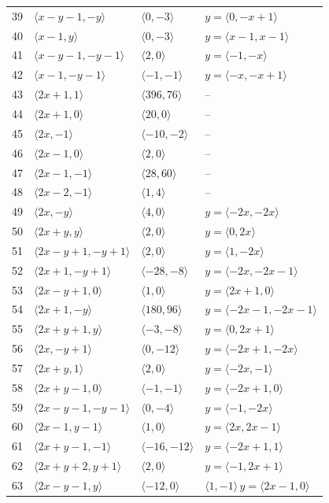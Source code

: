 \documentclass[11pt]{article}
\begin{document}
\begin{longtable}{@{}rlll@{}}
39 & $\langle x-y-1,-y\rangle$ & $\langle 0,-3\rangle$ & $y=\langle 0,-x+1\rangle$\\
40 & $\langle x-1,y\rangle$ & $\langle 0,-3\rangle$ & $y=\langle x-1,x-1\rangle$\\
41 & $\langle x-y-1,-y-1\rangle$ & $\langle 2,0\rangle$ & $y=\langle -1,-x\rangle$\\
42 & $\langle x-1,-y-1\rangle$ & $\langle -1,-1\rangle$ & $y=\langle -x,-x+1\rangle$\\
43 & $\langle 2x+1,1\rangle$ & $\langle 396,76\rangle$ & --\\
44 & $\langle 2x+1,0\rangle$ & $\langle 20,0\rangle$ & --\\
45 & $\langle 2x,-1\rangle$ & $\langle -10,-2\rangle$ & --\\
46 & $\langle 2x-1,0\rangle$ & $\langle 2,0\rangle$ & --\\
47 & $\langle 2x-1,-1\rangle$ & $\langle 28,60\rangle$ & --\\
48 & $\langle 2x-2,-1\rangle$ & $\langle 1,4\rangle$ & --\\
49 & $\langle 2x,-y\rangle$ & $\langle 4,0\rangle$ & $y=\langle -2x,-2x\rangle$\\
50 & $\langle 2x+y,y\rangle$ & $\langle 2,0\rangle$ & $y=\langle 0,2x\rangle$\\
51 & $\langle 2x-y+1,-y+1\rangle$ & $\langle 2,0\rangle$ & $y=\langle 1,-2x\rangle$\\
52 & $\langle 2x+1,-y+1\rangle$ & $\langle -28,-8\rangle$ & $y=\langle -2x,-2x-1\rangle$\\
53 & $\langle 2x-y+1,0\rangle$ & $\langle 1,0\rangle$ & $y=\langle 2x+1,0\rangle$\\
54 & $\langle 2x+1,-y\rangle$ & $\langle 180,96\rangle$ & $y=\langle -2x-1,-2x-1\rangle$\\
55 & $\langle 2x+y+1,y\rangle$ & $\langle -3,-8\rangle$ & $y=\langle 0,2x+1\rangle$\\
56 & $\langle 2x,-y+1\rangle$ & $\langle 0,-12\rangle$ & $y=\langle -2x+1,-2x\rangle$\\
57 & $\langle 2x+y,1\rangle$ & $\langle 2,0\rangle$ & $y=\langle -2x,-1\rangle$\\
58 & $\langle 2x+y-1,0\rangle$ & $\langle -1,-1\rangle$ & $y=\langle -2x+1,0\rangle$\\
59 & $\langle 2x-y-1,-y-1\rangle$ & $\langle 0,-4\rangle$ & $y=\langle -1,-2x\rangle$\\
60 & $\langle 2x-1,y-1\rangle$ & $\langle 1,0\rangle$ & $y=\langle 2x,2x-1\rangle$\\
61 & $\langle 2x+y-1,-1\rangle$ & $\langle -16,-12\rangle$ & $y=\langle -2x+1,1\rangle$\\
62 & $\langle 2x+y+2,y+1\rangle$ & $\langle 2,0\rangle$ & $y=\langle -1,2x+1\rangle$\\
63 & $\langle 2x-y-1,y\rangle$ & $\langle -12,0\rangle$ & $\langle 1,-1\rangle\,y=\langle 2x-1,0\rangle$\\
\end{longtable}
\endgroup
\end{document}
